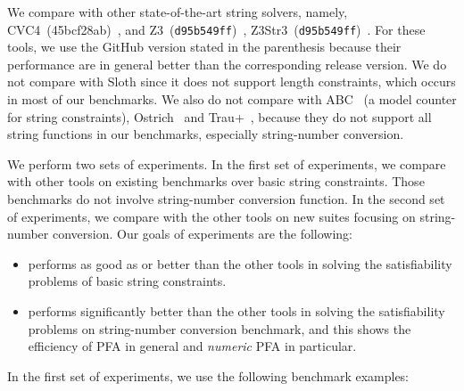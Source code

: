 We compare {\tool}  with other state-of-the-art string solvers, namely, CVC4~(45bcf28ab)~\cite{cvc4Tool}, and Z3~(\texttt{d95b549ff})~\cite{z3}, \textsf{Z3Str3}~(\texttt{d95b549ff})~\cite{zheng2013z3}. For these tools, we use the GitHub version stated in the parenthesis because their performance are in general better than the corresponding release version. 
We do not compare with Sloth \cite{sloth} since it does not support length constraints, which occurs in most of our benchmarks. We also do not compare with ABC~\cite{aydin2018parameterized} (a model counter for string constraints), Ostrich~\cite{chen2019decision} and \textsf{Trau+}~\cite{abdulla2019chain}, because they do not support all string functions in our benchmarks, especially string-number conversion.

We perform two sets of experiments. In the first set of experiments, we compare {\tool} with other tools on existing benchmarks over basic string constraints. Those benchmarks do not involve string-number conversion function. In the second set of experiments, we compare {\tool} with the other tools on new suites focusing on string-number conversion. Our goals of experiments are the following:
\smallskip


\begin{itemize}
	\item {\tool} performs as good as or better than the other tools in solving the  satisfiability problems of basic string constraints.
	
		\smallskip

	\item {\tool} performs significantly better than the other tools in solving the satisfiability problems on string-number conversion benchmark, and this shows  the efficiency of PFA in general and \emph{numeric} PFA in particular.
\end{itemize}
		\smallskip

In the first set of experiments, we use the following benchmark examples:

		\smallskip


